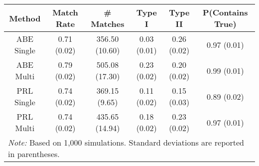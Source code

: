 
\begin{tabular}{cccccc}
\toprule
Method & Match Rate & \# Matches & Type I & Type II & P(Contains True)\\
\midrule
ABE Single & 0.71 (0.02) & 356.50 (10.60) & 0.03 (0.01) & 0.26 (0.02) & 0.97 (0.01)\\
ABE Multi & 0.79 (0.02) & 505.08 (17.30) & 0.23 (0.02) & 0.20 (0.02) & 0.99 (0.01)\\
PRL Single & 0.74 (0.02) & 369.15 (9.65) & 0.11 (0.02) & 0.15 (0.03) & 0.89 (0.02)\\
PRL Multi & 0.74 (0.02) & 435.65 (14.94) & 0.18 (0.02) & 0.23 (0.02) & 0.97 (0.01)\\
\bottomrule
\multicolumn{6}{l}{\textit{Note: } Based on 1,000 simulations. Standard deviations are reported in parentheses.}\\
\end{tabular}
